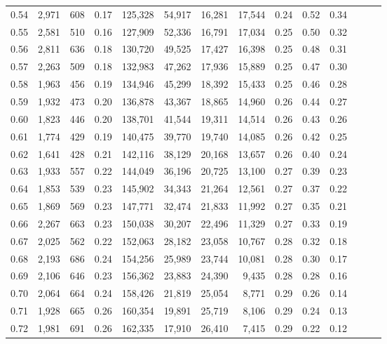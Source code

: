 \begin{tabular}{rrrrrrrrrrrrrr}
0.54 &  2,971 &  608 &  0.17 &  125,328 &   54,917 &  16,281 &  17,544 &  0.24 &  0.52 &      0.34 \\
0.55 &  2,581 &  510 &  0.16 &  127,909 &   52,336 &  16,791 &  17,034 &  0.25 &  0.50 &      0.32 \\
0.56 &  2,811 &  636 &  0.18 &  130,720 &   49,525 &  17,427 &  16,398 &  0.25 &  0.48 &      0.31 \\
0.57 &  2,263 &  509 &  0.18 &  132,983 &   47,262 &  17,936 &  15,889 &  0.25 &  0.47 &      0.30 \\
0.58 &  1,963 &  456 &  0.19 &  134,946 &   45,299 &  18,392 &  15,433 &  0.25 &  0.46 &      0.28 \\
0.59 &  1,932 &  473 &  0.20 &  136,878 &   43,367 &  18,865 &  14,960 &  0.26 &  0.44 &      0.27 \\
0.60 &  1,823 &  446 &  0.20 &  138,701 &   41,544 &  19,311 &  14,514 &  0.26 &  0.43 &      0.26 \\
0.61 &  1,774 &  429 &  0.19 &  140,475 &   39,770 &  19,740 &  14,085 &  0.26 &  0.42 &      0.25 \\
0.62 &  1,641 &  428 &  0.21 &  142,116 &   38,129 &  20,168 &  13,657 &  0.26 &  0.40 &      0.24 \\
0.63 &  1,933 &  557 &  0.22 &  144,049 &   36,196 &  20,725 &  13,100 &  0.27 &  0.39 &      0.23 \\
0.64 &  1,853 &  539 &  0.23 &  145,902 &   34,343 &  21,264 &  12,561 &  0.27 &  0.37 &      0.22 \\
0.65 &  1,869 &  569 &  0.23 &  147,771 &   32,474 &  21,833 &  11,992 &  0.27 &  0.35 &      0.21 \\
0.66 &  2,267 &  663 &  0.23 &  150,038 &   30,207 &  22,496 &  11,329 &  0.27 &  0.33 &      0.19 \\
0.67 &  2,025 &  562 &  0.22 &  152,063 &   28,182 &  23,058 &  10,767 &  0.28 &  0.32 &      0.18 \\
0.68 &  2,193 &  686 &  0.24 &  154,256 &   25,989 &  23,744 &  10,081 &  0.28 &  0.30 &      0.17 \\
0.69 &  2,106 &  646 &  0.23 &  156,362 &   23,883 &  24,390 &   9,435 &  0.28 &  0.28 &      0.16 \\
0.70 &  2,064 &  664 &  0.24 &  158,426 &   21,819 &  25,054 &   8,771 &  0.29 &  0.26 &      0.14 \\
0.71 &  1,928 &  665 &  0.26 &  160,354 &   19,891 &  25,719 &   8,106 &  0.29 &  0.24 &      0.13 \\
0.72 &  1,981 &  691 &  0.26 &  162,335 &   17,910 &  26,410 &   7,415 &  0.29 &  0.22 &      0.12 \\

\end{tabular}
